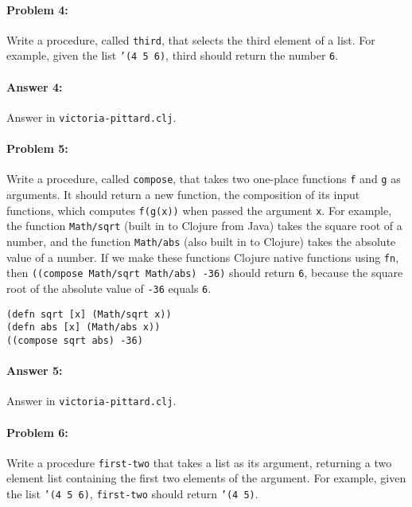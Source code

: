 \documentclass[10pt]{article}
\begin{document}
\hrulefill
\paragraph{Problem 4:}
  Write a procedure, called \texttt{third}, that selects the third
  element of a list. For example, given the list \texttt{'(4 5 6)},
  third should return the number \texttt{6}.

\paragraph{Answer 4:} Answer in \texttt{victoria-pittard.clj}.

\hrulefill
\paragraph{Problem 5:}
Write a procedure, called \texttt{compose}, that takes two one-place
functions \texttt{f} and \texttt{g} as arguments. It should return a
new function, the composition of its input functions, which computes
\texttt{f(g(x))} when passed the argument \texttt{x}. For example, the
function \texttt{Math/sqrt} (built in to Clojure from Java) takes the
square root of a number, and the function \texttt{Math/abs} (also
built in to Clojure) takes the absolute value of a number. If we make
these functions Clojure native functions using \texttt{fn}, then
\texttt{((compose Math/sqrt Math/abs) -36)} should return \texttt{6},
because the square root of the absolute value of \texttt{-36} equals
\texttt{6}.

\begin{lstlisting}
(defn sqrt [x] (Math/sqrt x))
(defn abs [x] (Math/abs x))
((compose sqrt abs) -36)
\end{lstlisting}

\paragraph{Answer 5:} Answer in \texttt{victoria-pittard.clj}.

\hrulefill
\paragraph{Problem 6:}
  Write a procedure \texttt{first-two} that takes a list as its argument,
  returning a two element list containing the first two elements of
  the argument. For example, given the list \texttt{'(4 5 6)},
  \texttt{first-two} should return \texttt{'(4 5)}.
\end{document}
